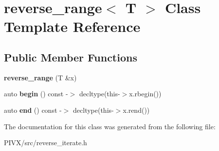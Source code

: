 \hypertarget{classreverse__range}{}\section{reverse\+\_\+range$<$ T $>$ Class Template Reference}
\label{classreverse__range}
\subsection*{Public Member Functions}
\begin{DoxyCompactItemize}
\item 
\mbox{\label{classreverse__range_a5db504f7033079a90c464efc7ff96fb3}} 
{\bfseries reverse\+\_\+range} (T \&x)
\item 
\mbox{\label{classreverse__range_aadf265e643103b6cab3ad9ecdebb9571}} 
auto {\bfseries begin} () const -\/$>$ decltype(this-\/$>$x.\+rbegin())
\item 
\mbox{\label{classreverse__range_acd95521213e8796a78c4ef11c81df686}} 
auto {\bfseries end} () const -\/$>$ decltype(this-\/$>$x.\+rend())
\end{DoxyCompactItemize}


The documentation for this class was generated from the following file\+:\begin{DoxyCompactItemize}
\item 
P\+I\+V\+X/src/reverse\+\_\+iterate.\+h\end{DoxyCompactItemize}
